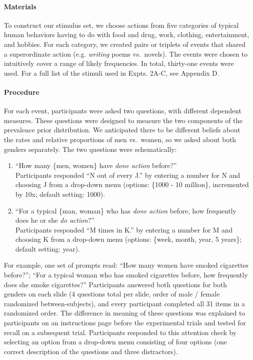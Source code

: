 \documentclass[english,,man,floatsintext]{apa6}
\let\oldparagraph\paragraph
\renewcommand{\paragraph}[1]{\oldparagraph{#1}\mbox{}}
\theoremstyle{definition}
\theoremstyle{definition}
\theoremstyle{definition}
\theoremstyle{remark}
\begin{document}
\hypertarget{materials}{%
\paragraph{Materials}\label{materials}}

To construct our stimulus set, we choose actions from five categories of
typical human behaviors having to do with food and drug, work, clothing,
entertainment, and hobbies. For each category, we created pairs or
triplets of events that shared a superordinate action (e.g.
\emph{writing} poems vs.~novels). The events were chosen to intuitively
cover a range of likely frequencies. In total, thirty-one events were
used. For a full list of the stimuli used in Expts. 2A-C, see Appendix
D.

\hypertarget{procedure}{%
\paragraph{Procedure}\label{procedure}}

For each event, participants were asked two questions, with different
dependent measures. These questions were designed to measure the two
components of the prevalence prior distribution. We anticipated there to
be different beliefs about the rates and relative proportions of men
vs.~women, so we asked about both genders separately. The two questions
were schematically:

\begin{enumerate}
\item ``How many \{men, women\} have \emph{done action} before?'' \\

Participants responded ``N out of every J.'' by entering a number for N and choosing J from a drop-down menu (options: \{1000 - 10 million\}, incremented by 10x; default setting: 1000).

\item ``For a typical \{man, woman\} who has \emph{done action}  before, how frequently does he or she \emph{do action}?''\\  

Participants responded ``M times in K.'' by entering a number for M and choosing K from a drop-down menu (options: \{week, month, year, 5 years\}; default setting: year).
\end{enumerate}

For example, one set of prompts read: \enquote{How many women have
smoked cigarettes before?}; \enquote{For a typical woman who has smoked
cigarettes before, how frequently does she smoke cigarettes?}
Participants answered both questions for both genders on each slide (4
questions total per slide, order of male / female randomized
between-subjects), and every participant completed all 31 items in a
randomized order. The difference in meaning of these questions was
explained to participants on an instructions page before the
experimental trials and tested for recall on a subsequent trial.
Participants responded to this attention check by selecting an option
from a drop-down menu consisting of four options (one correct
description of the questions and three distractors).
\end{document}
